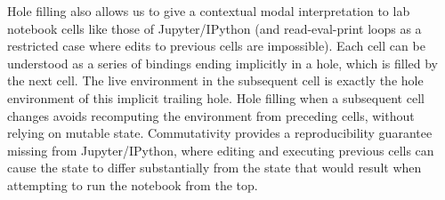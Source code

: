 
Hole filling also allows us to give a contextual modal interpretation
to lab notebook cells  like those of
Jupyter/IPython \cite{PER-GRA:2007} (and read-eval-print loops as a restricted case
where edits to previous cells are impossible).
%
Each cell can be understood as a series of 
bindings ending implicitly in a hole, which is filled by the next cell.
The live environment in the subsequent cell is exactly the hole environment of this implicit trailing hole.
%
Hole filling when a subsequent cell changes avoids recomputing the
environment from preceding cells, without relying on mutable state. Commutativity provides a reproducibility guarantee
missing from Jupyter/IPython, where editing and executing previous cells can cause the state to differ substantially from the state that would result when attempting to run the notebook from the top.

\begin{comment}

\begin{theorem}[Maximum Informativity]
If the elaboration produces $t1$, and there exists another possible type
choice $t2$, then $t1 \sim t2$ and $t1 JOIN t2 = t1$
\end{theorem}\footnote{idea is that special casing the holes in EANEHole gives you ``the
most descriptive hole types'' for some sense of what that means -- they'd
all just be hole other wise. from Matt:
\begin{quote}
It sounds like we need a something akin to an abstract domain (a lattice),
where hole has the least information, and a fully-defined type (without
holes) has the most information.  You can imagine that this lattice really
expands the existing definition we have of type consistency, which is
merely the predicate that says whether two types are comparable
(“join-able”) in this lattice.  lattice join is the operation that goes
through the structure of two (consistent) types, and chooses the structure
that is more defined (i.e., non-hole, if given the choice between hole and
non-hole).

The rule choosenonhole below is the expansion of this consistency rule that
we already have (hole consistent with everything)
\end{quote}}

\begin{verbatim}
t not hole
-------------------- :: choose-non-hole
hole JOIN t  = t
\end{verbatim}
\begin{verbatim}
------------ :: hole-consistent-with-everything
hole ~ t
\end{verbatim}

\end{comment}
